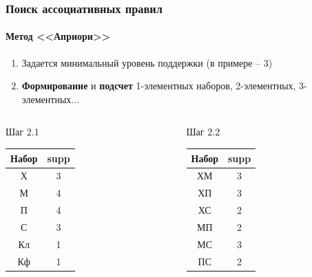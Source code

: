 \documentclass[xcolor=table]{beamer}
\begin{document}
\begin{frame}
  \frametitle{Поиск ассоциативных правил}
  \framesubtitle{Метод <<Априори>>}
  
  \begin{enumerate}
    \item Задается минимальный уровень поддержки (в примере -- 3)
    \item \textbf{Формирование} и \textbf{подсчет} 1-элементных наборов, 2-элементных, 3-элементных... \\
  \end{enumerate}

  \begin{columns}[t]
   
    \begin{column}{0.3\textwidth}
      \begin{center}
        Шаг 2.1
        \begin{tabular}{|c|c|}
          \hline
          Набор & supp \\ \hline
          \cellcolor{cell2} Х & \cellcolor{cell2} 3 \\ \hline
          \cellcolor{cell2} М & \cellcolor{cell2} 4 \\ \hline
          \cellcolor{cell2} П & \cellcolor{cell2} 4 \\ \hline
          \cellcolor{cell2} С & \cellcolor{cell2} 3 \\ \hline
          Кл & 1 \\ \hline
          Кф & 1 \\ \hline
        \end{tabular}
      \end{center}
    \end{column}

    \begin{column}{0.3\textwidth}
      \begin{center}
        Шаг 2.2
        \begin{tabular}{|c|c|}
          \hline
          Набор & supp \\ \hline
          \cellcolor{cell2} ХМ & \cellcolor{cell2} 3 \\ \hline
          \cellcolor{cell2} ХП & \cellcolor{cell2} 3 \\ \hline
          ХС & 2 \\ \hline
          МП & 2 \\ \hline
          \cellcolor{cell2} МС & \cellcolor{cell2} 3 \\ \hline
          ПС & 2 \\ \hline
        \end{tabular}
      \end{center}
    \end{column}


\end{columns}
\end{frame}
\end{document}
